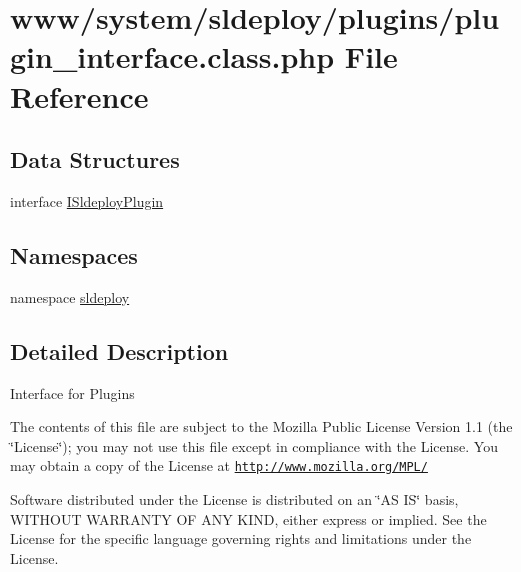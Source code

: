 \hypertarget{plugin__interface_8class_8php}{
\section{www/system/sldeploy/plugins/plugin\_\-interface.class.php File Reference}
\label{plugin__interface_8class_8php}
}
\subsection*{Data Structures}
\begin{DoxyCompactItemize}
\item 
interface \hyperlink{interface_i_sldeploy_plugin}{ISldeployPlugin}
\end{DoxyCompactItemize}
\subsection*{Namespaces}
\begin{DoxyCompactItemize}
\item 
namespace \hyperlink{namespacesldeploy}{sldeploy}
\end{DoxyCompactItemize}


\subsection{Detailed Description}
Interface for Plugins

The contents of this file are subject to the Mozilla Public License Version 1.1 (the \char`\"{}License\char`\"{}); you may not use this file except in compliance with the License. You may obtain a copy of the License at \href{http://www.mozilla.org/MPL/}{\tt http://www.mozilla.org/MPL/}

Software distributed under the License is distributed on an \char`\"{}AS IS\char`\"{} basis, WITHOUT WARRANTY OF ANY KIND, either express or implied. See the License for the specific language governing rights and limitations under the License. 